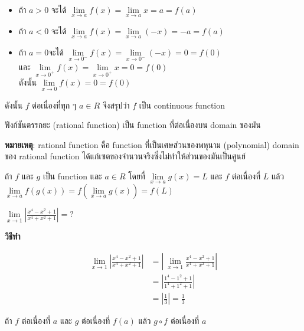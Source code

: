 \documentclass[
]{book}
\begin{document}
\begin{itemize}
\item
  ถ้า \(a>0\) จะได้
  \(\underset{x\rightarrow a}{\lim}f(x)=\underset{x\rightarrow a}{\lim}x=a=f(a)\)
\item
  ถ้า \(a<0\) จะได้
  \(\underset{x\rightarrow a}{\lim}f(x)=\underset{x\rightarrow a}{\lim}(-x)=-a=f(a)\)
\item
  ถ้า \(a=0\)จะได้
  \(\underset{x\rightarrow 0^{-}}{\lim}f(x)=\underset{x\rightarrow 0^{-}}{\lim}(-x)=0=f(0)\)\\
  และ
  \(\underset{x\rightarrow 0^{+}}{\lim}f(x)=\underset{x\rightarrow 0^{+}}{\lim}x=0=f(0)\)\\
  ดังนั้น \(\underset{x\rightarrow 0}{\lim}f(x)=0=f(0)\)
\end{itemize}

ดังนั้น \(f\) ต่อเนื่องที่ทุก ๆ \(a\in R\) จึงสรุปว่า \(f\) เป็น continuous function

\label{thm-cont-2}
ฟังก์ชันตรรกยะ (rational function) เป็น function ที่ต่อเนื่องบน domain ของมัน

\textbf{หมายเหตุ}: rational function คือ function ที่เป็นเศษส่วนของพหุนาม
(polynomial) domain ของ rational function
ได้แก่เซตของจำนวนจริงซึ่งไม่ทำให้ส่วนของมันเป็นศูนย์

\label{thm-cont-3}
ถ้า \(f\) และ \(g\) เป็น function และ \(a\in R\) โดยที่
\(\underset{x\rightarrow a}{\lim}g(x)=L\) และ \(f\) ต่อเนื่องที่ \(L\) แล้ว
\(\underset{x\rightarrow a}{\lim}f(g(x))=f(\underset{x\rightarrow a}{\lim}g(x))=f(L)\)

\label{ex-cont-2}
\(\underset{x\rightarrow 1}{\lim}\left| \frac{x^{4}-x^{2}+1}{x^{4}+x^{2}+1}\right| =?\)

\textbf{วิธีทำ}

\begin{equation}
  \begin{aligned}
    \underset{x\rightarrow 1}{\lim}\left| \frac{x^{4}-x^{2}+1}{x^{4}+x^{2}+1}\right|
    &=\left| \ \underset{x\rightarrow 1}{\lim}\frac{x^{4}-x^{2}+1}{x^{4}+x^{2}+1}\right| \\
    &=\left| \frac{1^{4}-1^{2}+1}{1^{4}+1^{2}+1}\right| \\
    &=\left| \frac{1}{3}\right| =\frac{1}{3}
  \end{aligned}
\end{equation}

\label{thm-cont-4}
ถ้า \(f\) ต่อเนื่องที่ \(a\) และ \(g\) ต่อเนื่องที่ \(f(a)\) แล้ว \(g\circ f\)
ต่อเนื่องที่ \(a\)
\end{document}
